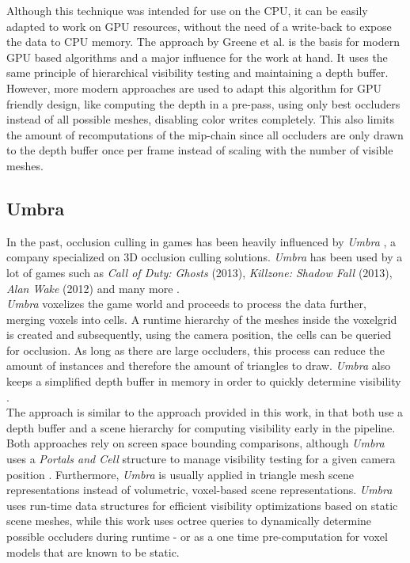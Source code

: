 \noindent
Although this technique was intended for use on the \ac{CPU}, it can be easily adapted to work on \ac{GPU} resources, 
without the need of a write-back to expose the data to \ac{CPU} memory. The approach by Greene et al. is the basis for 
modern \ac{GPU} based algorithms and a major influence for the work at hand. It uses the same principle of hierarchical 
visibility testing and maintaining a depth buffer. \\

\noindent
However, more modern approaches are used to adapt this algorithm for \ac{GPU} friendly design, like computing the depth 
in a pre-pass, using only best occluders instead of all possible meshes, disabling color writes completely. This also 
limits the amount of recomputations of the mip-chain since all occluders are only drawn to the depth buffer once per 
frame instead of scaling with the number of visible meshes.

\subsection*{Umbra}

In the past, occlusion culling in games has been heavily influenced by \emph{Umbra} \cite{Umbra2024}, a company 
specialized on 3D occlusion culling solutions. \emph{Umbra} has been used by a lot of games such as 
\emph{Call of Duty: Ghosts} (2013), \emph{Killzone: Shadow Fall} (2013), \emph{Alan Wake} (2012) and many more 
\cite{UmbraWiki,CallOfDutyGhostsCredits,KillzoneUmbra,AlanWakeUmbra}. \\

\noindent
\emph{Umbra} voxelizes the game world and proceeds to process the data further, merging voxels into cells. 
A runtime hierarchy of the meshes inside the voxelgrid is created and subsequently, using the camera position, 
the cells can be queried for occlusion. As long as there are large occluders, this process can reduce the amount 
of instances and therefore the amount of triangles to draw. \emph{Umbra} also keeps a simplified depth buffer in 
memory in order to quickly determine visibility \cite{Medium2018}. \\

\noindent 
The approach is similar to the approach provided  in this work, in that both use a depth buffer and a scene hierarchy 
for computing visibility early in the pipeline. Both approaches rely on screen space bounding comparisons, although 
\emph{Umbra} uses a \emph{Portals and Cell} structure to manage visibility testing for a given camera position 
\cite{Medium2018}. Furthermore, \emph{Umbra} is usually applied in triangle mesh scene representations instead 
of volumetric, voxel-based scene representations. \emph{Umbra} uses run-time data structures for efficient visibility 
optimizations based on static scene meshes, while this work uses octree queries to dynamically determine possible 
occluders during runtime - or as a one time pre-computation for voxel models that are known to be static. \\


